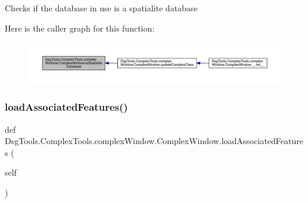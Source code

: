 \begin{DoxyVerb}Checks if the database in use is a spatialite database
\end{DoxyVerb}
 Here is the caller graph for this function\+:
\nopagebreak
\begin{figure}[H]
\begin{center}
\leavevmode
\includegraphics[width=350pt]{class_dsg_tools_1_1_complex_tools_1_1complex_window_1_1_complex_window_a15c02d111037e49f28f80d537ae76d22_icgraph}
\end{center}
\end{figure}
\mbox{\label{class_dsg_tools_1_1_complex_tools_1_1complex_window_1_1_complex_window_adb4536abecc18bd3ed9915d879a72337}} 
\subsubsection{\texorpdfstring{load\+Associated\+Features()}{loadAssociatedFeatures()}}
{\footnotesize\ttfamily def Dsg\+Tools.\+Complex\+Tools.\+complex\+Window.\+Complex\+Window.\+load\+Associated\+Features (\begin{DoxyParamCaption}\item[{}]{self }\end{DoxyParamCaption})}

